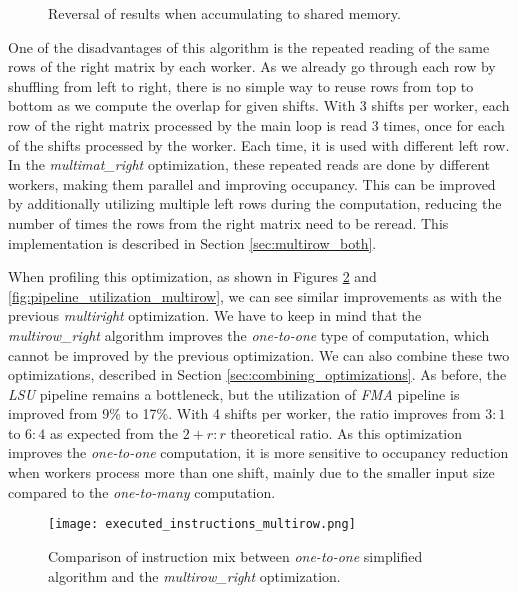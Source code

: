 \begin{figure}[ht]
	\centering
	\def\svgwidth{0.7\textwidth}
	
	\caption{Reversal of results when accumulating to shared memory.}
	\label{fig:multirow_reversal}
\end{figure}

One of the disadvantages of this algorithm is the repeated reading of the same rows of the right matrix by each worker. As we already go through each row by shuffling from left to right, there is no simple way to reuse rows from top to bottom as we compute the overlap for given shifts. With 3 shifts per worker, each row of the right matrix processed by the main loop is read 3 times, once for each of the shifts processed by the worker. Each time, it is used with different left row. In the \textit{multimat\_right} optimization, these repeated reads are done by different workers, making them parallel and improving occupancy. This can be improved by additionally utilizing multiple left rows during the computation, reducing the number of times the rows from the right matrix need to be reread. This implementation is described in Section \ref{sec:multirow_both}.


When profiling this optimization, as shown in Figures \ref{fig:executed_instructions_multirow} and \ref{fig:pipeline_utilization_multirow}, we can see similar improvements as with the previous \textit{multiright} optimization. We have to keep in mind that the \textit{multirow\_right} algorithm improves the \textit{one-to-one} type of computation, which cannot be improved by the previous optimization. We can also combine these two optimizations, described in Section \ref{sec:combining_optimizations}. As before, the \textit{LSU} pipeline remains a bottleneck, but the utilization of \textit{FMA} pipeline is improved from 9\% to 17\%. With 4 shifts per worker, the ratio improves from $3 : 1$ to $6 : 4$ as expected from the $2 + r : r$ theoretical ratio. As this optimization improves the \textit{one-to-one} computation, it is more sensitive to occupancy reduction when workers process more than one shift, mainly due to the smaller input size compared to the \textit{one-to-many} computation.

\begin{figure}[ht]
	\centering
	\texttt{[image: executed\_instructions\_multirow.png]}
	\caption{Comparison of instruction mix between \textit{one-to-one} simplified algorithm and the \textit{multirow\_right} optimization.}
	\label{fig:executed_instructions_multirow}
\end{figure}

